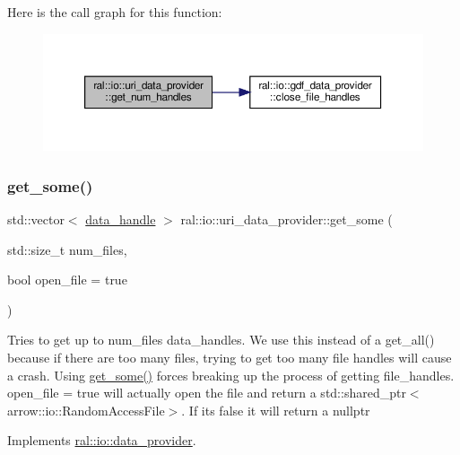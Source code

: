 Here is the call graph for this function\+:\nopagebreak
\begin{figure}[H]
\begin{center}
\leavevmode
\includegraphics[width=350pt]{classral_1_1io_1_1uri__data__provider_a89a2e8bd07ce00025d62e877ae56a871_cgraph}
\end{center}
\end{figure}
\mbox{\label{classral_1_1io_1_1uri__data__provider_a53be24f2a445940e82c15b324c7b7c5f}} 
\subsubsection{\texorpdfstring{get\+\_\+some()}{get\_some()}}
{\footnotesize\ttfamily std\+::vector$<$ \hyperlink{structral_1_1io_1_1data__handle}{data\+\_\+handle} $>$ ral\+::io\+::uri\+\_\+data\+\_\+provider\+::get\+\_\+some (\begin{DoxyParamCaption}\item[{std\+::size\+\_\+t}]{num\+\_\+files,  }\item[{bool}]{open\+\_\+file = {\ttfamily true} }\end{DoxyParamCaption})\hspace{0.3cm}{\ttfamily [virtual]}}

Tries to get up to num\+\_\+files data\+\_\+handles. We use this instead of a get\+\_\+all() because if there are too many files, trying to get too many file handles will cause a crash. Using \hyperlink{classral_1_1io_1_1uri__data__provider_a53be24f2a445940e82c15b324c7b7c5f}{get\+\_\+some()} forces breaking up the process of getting file\+\_\+handles. open\+\_\+file = true will actually open the file and return a std\+::shared\+\_\+ptr$<$arrow\+::io\+::\+Random\+Access\+File$>$. If its false it will return a nullptr 

Implements \hyperlink{classral_1_1io_1_1data__provider_ae65c935f9812ac3321b0c814fa4a5548}{ral\+::io\+::data\+\_\+provider}.

